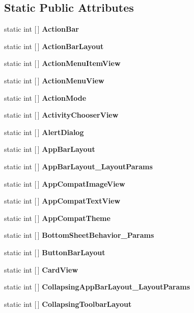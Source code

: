 \subsection*{Static Public Attributes}
\begin{DoxyCompactItemize}
\item 
static int \mbox{[}$\,$\mbox{]} {\bfseries Action\+Bar}
\item 
static int \mbox{[}$\,$\mbox{]} {\bfseries Action\+Bar\+Layout}
\item 
static int \mbox{[}$\,$\mbox{]} {\bfseries Action\+Menu\+Item\+View}
\item 
\mbox{\label{class_sample_app_1_1_droid_1_1_resource_1_1_styleable_afaa5471bc61c0f6d8c5e04a5841bf304}} 
static int \mbox{[}$\,$\mbox{]} {\bfseries Action\+Menu\+View}
\item 
static int \mbox{[}$\,$\mbox{]} {\bfseries Action\+Mode}
\item 
static int \mbox{[}$\,$\mbox{]} {\bfseries Activity\+Chooser\+View}
\item 
static int \mbox{[}$\,$\mbox{]} {\bfseries Alert\+Dialog}
\item 
static int \mbox{[}$\,$\mbox{]} {\bfseries App\+Bar\+Layout}
\item 
static int \mbox{[}$\,$\mbox{]} {\bfseries App\+Bar\+Layout\+\_\+\+Layout\+Params}
\item 
static int \mbox{[}$\,$\mbox{]} {\bfseries App\+Compat\+Image\+View}
\item 
static int \mbox{[}$\,$\mbox{]} {\bfseries App\+Compat\+Text\+View}
\item 
\mbox{\label{class_sample_app_1_1_droid_1_1_resource_1_1_styleable_ae6bac711d1d05e134af67d2d9799b5e2}} 
static int \mbox{[}$\,$\mbox{]} {\bfseries App\+Compat\+Theme}
\item 
static int \mbox{[}$\,$\mbox{]} {\bfseries Bottom\+Sheet\+Behavior\+\_\+\+Params}
\item 
static int \mbox{[}$\,$\mbox{]} {\bfseries Button\+Bar\+Layout}
\item 
static int \mbox{[}$\,$\mbox{]} {\bfseries Card\+View}
\item 
static int \mbox{[}$\,$\mbox{]} {\bfseries Collapsing\+App\+Bar\+Layout\+\_\+\+Layout\+Params}
\item 
static int \mbox{[}$\,$\mbox{]} {\bfseries Collapsing\+Toolbar\+Layout}

\end{DoxyCompactItemize}
